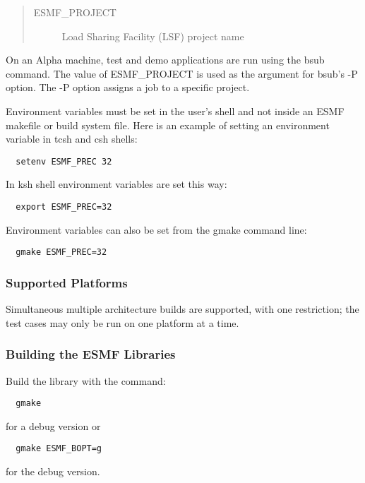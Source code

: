 \begin{quote}
\begin{description}
  \item[ESMF\_PROJECT] Load Sharing Facility (LSF) project name
\end{description}
\end{quote}

On an Alpha machine, test and demo applications are run using 
the bsub command.  The value of ESMF\_PROJECT is used as the 
argument for bsub's -P option. The -P option assigns a job to 
a specific project.  

Environment variables must be set in the user's shell and not
inside an ESMF makefile or build system file.  Here is an example 
of setting an environment variable in tcsh and csh shells:

\begin{verbatim}
  setenv ESMF_PREC 32
\end{verbatim}

In ksh shell environment variables are set this way:

\begin{verbatim}
  export ESMF_PREC=32
\end{verbatim}

Environment variables can also be set from the gmake command line:

\begin{verbatim}
  gmake ESMF_PREC=32
\end{verbatim}

\subsubsection{Supported Platforms}


Simultaneous multiple architecture builds are supported, with
one restriction; the test cases may only be run on one platform at a time. 

\subsubsection{Building the ESMF Libraries}
\label{BuildESMF}



Build the library with the command:
\begin{verbatim}
  gmake 
\end{verbatim}
  for a debug version or
\begin{verbatim}
  gmake ESMF_BOPT=g  
\end{verbatim}
  for the debug version.


